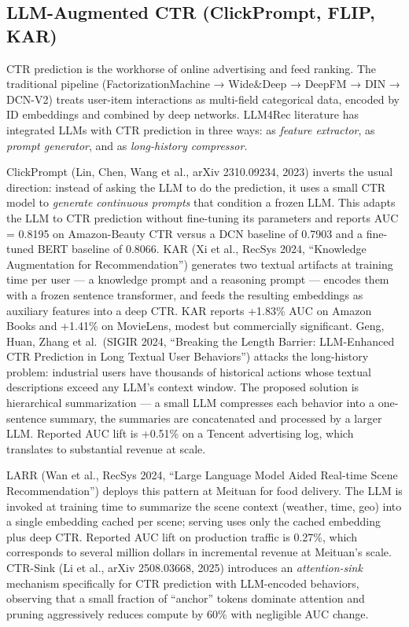 \subsection{LLM-Augmented CTR (ClickPrompt, FLIP, KAR)}\label{llm-augmented-ctr-clickprompt-flip-kar}

CTR prediction is the workhorse of online advertising and feed ranking. The traditional pipeline (FactorizationMachine → Wide\&Deep → DeepFM → DIN → DCN-V2) treats user-item interactions as multi-field categorical data, encoded by ID embeddings and combined by deep networks. LLM4Rec literature has integrated LLMs with CTR prediction in three ways: as \emph{feature extractor}, as \emph{prompt generator}, and as \emph{long-history compressor}.

ClickPrompt (Lin, Chen, Wang et al., arXiv 2310.09234, 2023) inverts the usual direction: instead of asking the LLM to do the prediction, it uses a small CTR model to \emph{generate continuous prompts} that condition a frozen LLM. This adapts the LLM to CTR prediction without fine-tuning its parameters and reports AUC = 0.8195 on Amazon-Beauty CTR versus a DCN baseline of 0.7903 and a fine-tuned BERT baseline of 0.8066. KAR (Xi et al., RecSys 2024, ``Knowledge Augmentation for Recommendation'') generates two textual artifacts at training time per user --- a knowledge prompt and a reasoning prompt --- encodes them with a frozen sentence transformer, and feeds the resulting embeddings as auxiliary features into a deep CTR. KAR reports +1.83\% AUC on Amazon Books and +1.41\% on MovieLens, modest but commercially significant. Geng, Huan, Zhang et al.~(SIGIR 2024, ``Breaking the Length Barrier: LLM-Enhanced CTR Prediction in Long Textual User Behaviors'') attacks the long-history problem: industrial users have thousands of historical actions whose textual descriptions exceed any LLM's context window. The proposed solution is hierarchical summarization --- a small LLM compresses each behavior into a one-sentence summary, the summaries are concatenated and processed by a larger LLM. Reported AUC lift is +0.51\% on a Tencent advertising log, which translates to substantial revenue at scale.

LARR (Wan et al., RecSys 2024, ``Large Language Model Aided Real-time Scene Recommendation'') deploys this pattern at Meituan for food delivery. The LLM is invoked at training time to summarize the scene context (weather, time, geo) into a single embedding cached per scene; serving uses only the cached embedding plus deep CTR. Reported AUC lift on production traffic is 0.27\%, which corresponds to several million dollars in incremental revenue at Meituan's scale. CTR-Sink (Li et al., arXiv 2508.03668, 2025) introduces an \emph{attention-sink} mechanism specifically for CTR prediction with LLM-encoded behaviors, observing that a small fraction of ``anchor'' tokens dominate attention and pruning aggressively reduces compute by 60\% with negligible AUC change.

